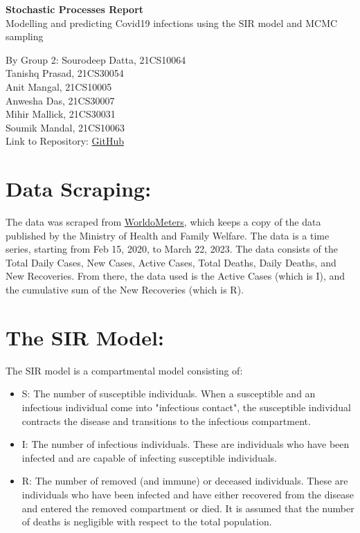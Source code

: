\documentclass[letterpaper,12pt]{report}
\begin{document}
{\centering
    \textbf{\Huge{Stochastic Processes Report}} \\ \vspace{5pt}
    \Large{Modelling and predicting Covid19 infections using the SIR model and MCMC sampling} \\
}
\begin{flushright}
\small{By Group 2: Sourodeep Datta, 21CS10064\\
Tanishq Prasad, 21CS30054\\
Anit Mangal, 21CS10005\\
Anwesha Das, 21CS30007\\
Mihir Mallick, 21CS30031\\
Soumik Mandal, 21CS10063}\\
Link to Repository: \href{https://github.com/TheLapisGoat/SIR-Model-with-MCMC-Analysis}{GitHub}
\end{flushright}

\section*{\large Data Scraping: } \vspace{-10pt}
The data was scraped from \href{https://www.worldometers.info/coronavirus/country/india/}{\color{Blue} WorldoMeters}, which keeps a copy of the data published by the Ministry of Health and Family Welfare. The data is a time series, starting from Feb 15, 2020, to March 22, 2023. The data consists of the Total Daily Cases, New Cases, Active Cases, Total Deaths, Daily Deaths, and New Recoveries. From there, the data used is the Active Cases (which is I), and the cumulative sum of the New Recoveries (which is R).
\vspace{-10pt}
\section*{\large The SIR Model:} \vspace{-10pt}
The SIR model is a compartmental model consisting of:\vspace{-5pt}
\begin{itemize}
    \item {S: The number of susceptible individuals. When a susceptible and an infectious individual come into "infectious contact", the susceptible individual contracts the disease and transitions to the infectious compartment.
    }\vspace{-5pt}
    \item {I: The number of infectious individuals. These are individuals who have been infected and are capable of infecting susceptible individuals.
    }\vspace{-5pt}
    \item {R: The number of removed (and immune) or deceased individuals. These are individuals who have been infected and have either recovered from the disease and entered the removed compartment or died. It is assumed that the number of deaths is negligible with respect to the total population.
    }
\end{itemize}\vspace{-5pt}
\end{document}
